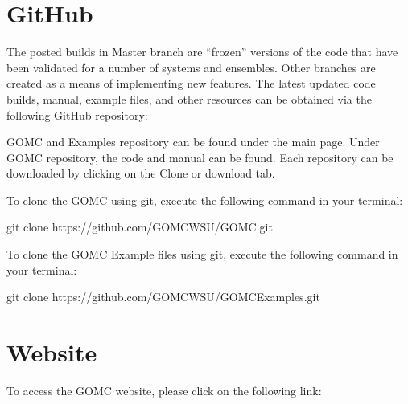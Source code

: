\documentclass[letterpaper,10pt,english]{sphinxmanual}
\begin{document}
\section{GitHub}
\label{\detokenize{download:github}}
\sphinxAtStartPar
The posted builds in Master branch are “frozen” versions of the code that have been validated for a number of systems and ensembles. Other branches are created as a means of implementing new features. The latest updated code builds, manual, example files, and other resources can be obtained via the following GitHub repository:

\sphinxAtStartPar
{}

\begin{figure}[htbp]
\centering

\noindent{}
\end{figure}

\sphinxAtStartPar
GOMC and Examples repository can be found under the main page. Under GOMC repository, the code and manual can be found. Each repository can be downloaded by clicking on the Clone or download tab.

\begin{figure}[htbp]
\centering

\noindent{}
\end{figure}

\sphinxAtStartPar
To clone the GOMC using git, execute the following command in your terminal:

\begin{sphinxVerbatim}[commandchars=\\\{\}]
\PYGZdl{} git clone https://github.com/GOMC\PYGZhy{}WSU/GOMC.git
\end{sphinxVerbatim}

\sphinxAtStartPar
To clone the GOMC Example files using git, execute the following command in your terminal:

\begin{sphinxVerbatim}[commandchars=\\\{\}]
\PYGZdl{} git clone https://github.com/GOMC\PYGZhy{}WSU/GOMC\PYGZus{}Examples.git
\end{sphinxVerbatim}


\section{Website}
\label{\detokenize{download:website}}
\sphinxAtStartPar
To access the GOMC website, please click on the following link:
\end{document}
